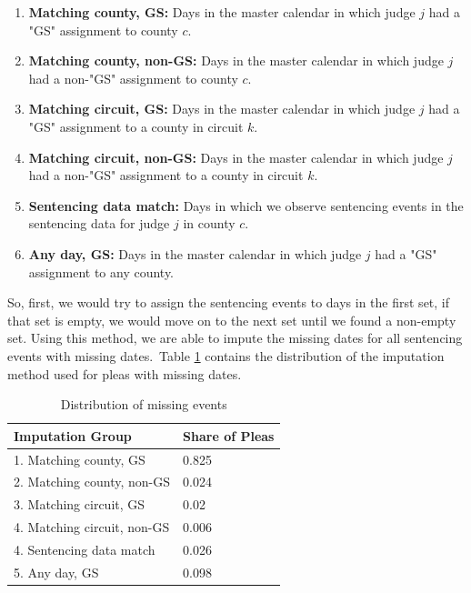 \documentclass[11pt]{article}
\theoremstyle{ModifiedStyle}
\begin{document}
      \begin{enumerate}
        \item \textbf{Matching county, GS:} Days in the master calendar in which judge $j$ had a "GS" assignment to county $c$.
        \item \textbf{Matching county, non-GS:} Days in the master calendar in which judge $j$ had a non-"GS" assignment to county $c$.
        \item \textbf{Matching circuit, GS:} Days in the master calendar in which judge $j$ had a "GS" assignment to a county in circuit $k$.
        \item \textbf{Matching circuit, non-GS:} Days in the master calendar in which judge $j$ had a non-"GS" assignment to a county in circuit $k$.
        \item \textbf{Sentencing data match:} Days in which we observe sentencing events in the sentencing data for judge $j$ in county $c$.
        \item \textbf{Any day, GS:} Days in the master calendar in which judge $j$ had a "GS" assignment to any county.
      \end{enumerate}

      So, first, we would try to assign the sentencing events to days in the first set, if that set is empty, we would move on to the next set until we found a non-empty set. Using this method, we are able to impute the missing dates for all sentencing events with missing dates. Table \ref{tab:imp} contains the distribution of the imputation method used for pleas with missing dates.

      \begin{table}[H]
          \centering
          \caption{Distribution of missing events}
          \label{tab:imp}
          \begin{tabular}{|l|l|}
          \hline
          \textbf{Imputation Group}   & \textbf{Share of Pleas} \\ \hline
          1. Matching county, GS      & 0.825                   \\ \hline
          2. Matching county, non-GS  & 0.024                   \\ \hline
          3. Matching circuit, GS     & 0.02                    \\ \hline
          4. Matching circuit, non-GS & 0.006                   \\ \hline
          4. Sentencing data match & 0.026 \\ \hline
          5. Any day, GS              & 0.098                    \\ \hline
          \end{tabular}
      \end{table}
\end{document}
